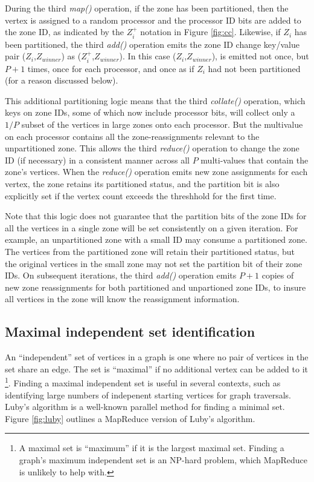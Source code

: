 During the third {\it map()} operation, if the zone has been
partitioned, then the vertex is assigned to a random processor and the
processor ID bits are added to the zone ID, as indicated by the
$Z_i^+$ notation in Figure \ref{fig:cc}.  Likewise, if $Z_i$ has been
partitioned, the third {\it add()} operation emits the zone ID change
key/value pair ($Z_i$,$Z_{winner}$) as ($Z_i^+$,$Z_{winner}$).  In
this case ($Z_i$,$Z_{winner}$), is emitted not once, but $P+1$ times,
once for each processor, and once as if $Z_i$ had not been partitioned
(for a reason discussed below).

This additional partitioning logic means that the third {\it
collate()} operation, which keys on zone IDs, some of which now
include processor bits, will collect only a $1/P$ subset of the
vertices in large zones onto each processor.  But the multivalue on
each processor contains all the zone-reassignments relevant to the
unpartitioned zone.  This allows the third {\it reduce()} operation to
change the zone ID (if necessary) in a consistent manner across all
$P$ multi-values that contain the zone's vertices.  When the {\it
reduce()} operation emits new zone assignments for each vertex, the
zone retains its partitioned status, and the partition bit is also
explicitly set if the vertex count exceeds the threshhold for the
first time.

Note that this logic does not guarantee that the partition bits of the
zone IDs for all the vertices in a single zone will be set
consistently on a given iteration.  For example, an unpartitioned zone
with a small ID may consume a partitioned zone.  The vertices from the
partitioned zone will retain their partitioned status, but the
original vertices in the small zone may not set the partition bit of
their zone IDs.  On subsequent iterations, the third {\it add()}
operation emits $P+1$ copies of new zone reassignments for both
partitioned and unpartioned zone IDs, to insure all vertices in the
zone will know the reassignment information.

\subsection{Maximal independent set identification}

An ``independent'' set of vertices in a graph is one where no pair of
vertices in the set share an edge.  The set is ``maximal'' if no
additional vertex can be added to it \footnote{A maximal set is
``maximum'' if it is the largest maximal set.  Finding a graph's
maximum independent set is an NP-hard problem, which MapReduce is
unlikely to help with.}.  Finding a maximal independent set is useful
in several contexts, such as identifying large numbers of indepenent
starting vertices for graph traversals.  Luby's algorithm \cite{Luby}
is a well-known parallel method for finding a minimal set.  Figure
\ref{fig:luby} outlines a MapReduce version of Luby's algorithm.

